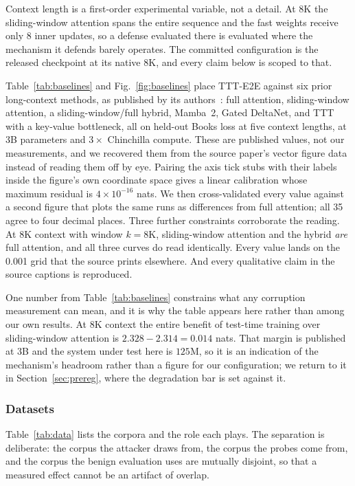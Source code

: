 \documentclass[journal]{IEEEtran}
\begin{document}
Context length is a first-order experimental variable, not a detail. At $8$K the
sliding-window attention spans the entire sequence and the fast weights receive
only $8$ inner updates, so a defense evaluated there is evaluated where the
mechanism it defends barely operates. The committed configuration is the released
checkpoint at its native $8$K, and every claim below is scoped to that.

Table~\ref{tab:baselines} and Fig.~\ref{fig:baselines} place TTT-E2E against six
prior long-context methods, as published by its
authors~\cite{tandon2025tttE2E}: full attention, sliding-window attention, a
sliding-window/full hybrid, Mamba~2, Gated DeltaNet, and TTT with a key-value
bottleneck, all on held-out Books loss at five context lengths, at 3B parameters
and $3\times$ Chinchilla compute. These are published values, not our
measurements, and we recovered them from the source paper's vector figure data
instead of reading them off by eye. Pairing the axis tick stubs with their labels
inside the figure's own coordinate space gives a linear calibration whose maximum
residual is $4\times10^{-16}$ nats. We then cross-validated every value against a
second figure that plots the same runs as differences from full attention; all 35
agree to four decimal places. Three further constraints corroborate the reading.
At 8K context with window $k=8\text{K}$, sliding-window attention and the hybrid
\emph{are} full attention, and all three curves do read identically. Every value
lands on the 0.001 grid that the source prints elsewhere. And every qualitative
claim in the source captions is reproduced.




One number from Table~\ref{tab:baselines} constrains what any corruption
measurement can mean, and it is why the table appears here rather than among our
own results. At 8K context the entire benefit of test-time training over
sliding-window attention is $2.328 - 2.314 = 0.014$ nats. That margin is published
at 3B and the system under test here is $125$M, so it is an indication of the
mechanism's headroom rather than a figure for our configuration; we return to it in
Section~\ref{sec:prereg}, where the degradation bar is set against it.

\subsubsection{Datasets}
Table~\ref{tab:data} lists the corpora and the role each plays. The separation is
deliberate: the corpus the attacker draws from, the corpus the probes come from, and
the corpus the benign evaluation uses are mutually disjoint, so that a measured
effect cannot be an artifact of overlap.
\end{document}
